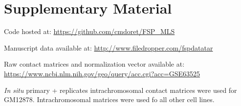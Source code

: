 \documentclass[11pt,a4paper]{report}
\begin{document}
\section{Supplementary Material}
Code hosted at: \url{https://github.com/cmdoret/FSP_MLS}

\noindent Manuscript data available at: \url{http://www.filedropper.com/fspdatatar}

\noindent Raw contact matrices and normalization vector available at: \url{https://www.ncbi.nlm.nih.gov/geo/query/acc.cgi?acc=GSE63525}

\noindent \textit{In situ} primary + replicates intrachromosomal contact matrices were used for GM12878. Intrachromosomal matrices were used fo all other cell lines.


\fancyhead[L]{\slshape }

\end{document}
